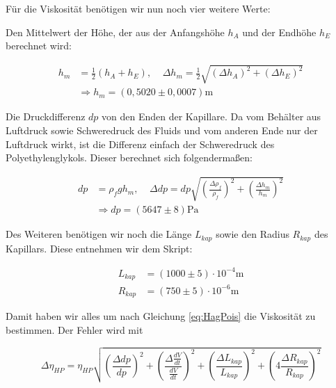 \documentclass{article}
\begin{document}
\phantom{.}

Für die Viskosität benötigen wir nun noch vier weitere Werte:

Den Mittelwert der Höhe, der aus der Anfangshöhe $h_A$ und der Endhöhe $h_E$ berechnet wird:

\begin{equation}
    \begin{split}
        h_m &= \frac{1}{2} (h_A + h_E), \ \ \ \ \ \Delta h_m = \frac{1}{2} \sqrt{(\Delta h_A)^2 + (\Delta h_E)^2} \\
        &\Rightarrow h_m = (0,5020 \pm 0,0007) \text{m}        
    \end{split}
\end{equation}

Die Druckdifferenz $dp$ von den Enden der Kapillare. Da vom Behälter aus Luftdruck sowie Schweredruck des Fluids und vom anderen Ende nur der Luftdruck wirkt, ist die Differenz einfach der Schweredruck des Polyethylenglykols. Dieser berechnet sich folgendermaßen:

\begin{equation}
    \begin{split}
        dp &= \rho_f g h_m, \ \ \ \ \ \Delta dp = dp \sqrt{\left( \frac{\Delta \rho_f}{\rho_f} \right)^2 + \left( \frac{\Delta h_m}{h_m} \right)^2} \\
        &\Rightarrow dp = (5647 \pm 8) \text{Pa}
    \end{split}
\end{equation}

Des Weiteren benötigen wir noch die Länge $L_{kap}$ sowie den Radius $R_{kap}$ des Kapillars. Diese entnehmen wir dem Skript:

\begin{equation}
    \begin{split}
        L_{kap} &= (1000 \pm 5) \cdot 10^{-4} \text{m} \\
        R_{kap} &= (750 \pm 5) \cdot 10^{-6} \text{m}
    \end{split} 
\end{equation}

Damit haben wir alles um nach Gleichung \ref{eq:HagPois} die Viskosität zu bestimmen. Der Fehler wird mit

\begin{equation}
    \Delta \eta_{HP} = \eta_{HP} \sqrt{\left( \frac{\Delta dp}{dp} \right)^2 + \left( \frac{\Delta \frac{dV}{dt}}{\frac{dV}{dt}} \right)^2 + \left( \frac{\Delta L_{kap}}{L_{kap}} \right)^2 + \left( 4 \frac{\Delta R_{kap}}{R_{kap}} \right)^2}
\end{equation}
\end{document}
